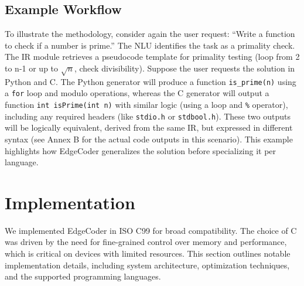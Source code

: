 \documentclass[12pt]{article}
\begin{document}
\subsection{Example Workflow}
To illustrate the methodology, consider again the user request: “Write a function to check if a number is prime.” The NLU identifies the task as a primality check. The IR module retrieves a pseudocode template for primality testing (loop from 2 to n-1 or up to $\sqrt{n}$, check divisibility). Suppose the user requests the solution in Python and C. The Python generator will produce a function \texttt{is\_prime(n)} using a \texttt{for} loop and modulo operations, whereas the C generator will output a function \texttt{int isPrime(int n)} with similar logic (using a loop and \texttt{\%} operator), including any required headers (like \texttt{stdio.h} or \texttt{stdbool.h}). These two outputs will be logically equivalent, derived from the same IR, but expressed in different syntax (see Annex B for the actual code outputs in this scenario). This example highlights how EdgeCoder generalizes the solution before specializing it per language.

\section{Implementation}
\noindent 
We implemented EdgeCoder in ISO C99 for broad compatibility. The choice of C was driven by the need for fine-grained control over memory and performance, which is critical on devices with limited resources. This section outlines notable implementation details, including system architecture, optimization techniques, and the supported programming languages.
\end{document}
